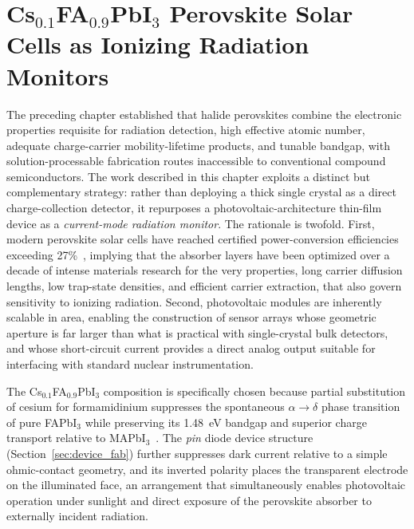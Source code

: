 
\chapter{Cs$_{0.1}$FA$_{0.9}$PbI$_3$ Perovskite Solar Cells as Ionizing Radiation Monitors}
\label{ch:CsFAPbI}

The preceding chapter established that halide perovskites combine the
electronic properties requisite for radiation detection, high effective
atomic number, adequate charge-carrier mobility-lifetime products, and
tunable bandgap, with solution-processable fabrication routes
inaccessible to conventional compound semiconductors.  The work
described in this chapter exploits a distinct but complementary
strategy: rather than deploying a thick single crystal as a direct
charge-collection detector, it repurposes a photovoltaic-architecture
thin-film device as a \emph{current-mode radiation monitor}.  The
rationale is twofold.  First, modern perovskite solar cells have
reached certified power-conversion efficiencies exceeding
27\%~\cite{Li2026record}, implying that the absorber layers have been
optimized over a decade of intense materials research for the very
properties, long carrier diffusion lengths, low trap-state densities,
and efficient carrier extraction, that also govern sensitivity to
ionizing radiation.  Second, photovoltaic modules are inherently scalable
in area, enabling the construction of sensor arrays whose geometric
aperture is far larger than what is practical with single-crystal bulk
detectors, and whose short-circuit current provides a direct analog
output suitable for interfacing with standard nuclear instrumentation.

The Cs$_{0.1}$FA$_{0.9}$PbI$_3$ composition is specifically chosen
because partial substitution of cesium for formamidinium suppresses
the spontaneous $\alpha \to \delta$ phase transition of pure FAPbI$_3$
while preserving its 1.48~eV bandgap and superior charge transport
relative to MAPbI$_3$~\cite{Yi2016}.  The \emph{pin} diode device
structure (Section~\ref{sec:device_fab}) further suppresses dark
current relative to a simple ohmic-contact geometry, and its inverted
polarity places the transparent electrode on the illuminated face,
an arrangement that simultaneously enables photovoltaic operation under
sunlight and direct exposure of the perovskite absorber to externally
incident radiation.

